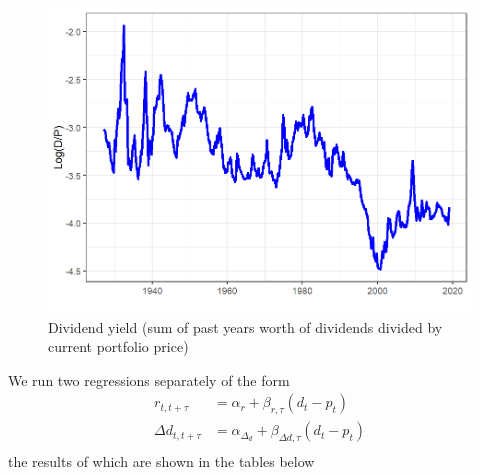 \documentclass[11pt,letter]{article}
\begin{document}
\begin{figure}
	\includegraphics[width=\linewidth]{log_dividend_yield.png}
	\caption{Dividend yield (sum of past years worth of dividends divided by current portfolio price)}
	\label{fig:div_yield}
\end{figure}
We run two regressions separately of the form
\begin{equation*}
	\begin{split}
	r_{t, t+\tau} & = \alpha_r + \beta_{r, \tau}(d_t - p_t)\\
	\Delta d_{t, t+\tau} & = \alpha_{\Delta_d}+\beta_{\Delta d, \tau}(d_t - p_t)\\
	\end{split}
\end{equation*}
the results of which are shown in the tables below
\end{document}

